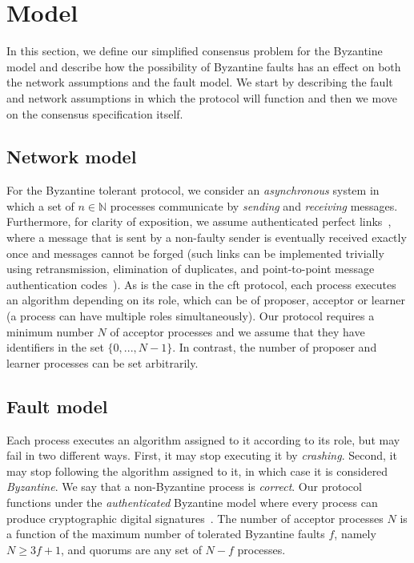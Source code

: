 \section{Model} \label{bft_model}

In this section, we define our simplified consensus problem for the Byzantine model and describe how the possibility of Byzantine faults has an effect on both the network assumptions and the fault model. We start by describing the fault and network assumptions in which the protocol will function and then we move on the consensus specification itself.

\subsection{Network model}
For the Byzantine tolerant protocol, we consider an \emph{asynchronous} system in which a set of $n \in \mathbb{N}$ processes communicate by \emph{sending} and \emph{receiving} messages. Furthermore, for clarity of exposition, we assume authenticated perfect links~\cite{cgr:book}, where a message that is sent by a non-faulty sender is eventually received exactly once and messages cannot be forged (such links can be implemented trivially using retransmission, elimination of duplicates, and point-to-point message authentication codes~\cite{cgr:book}). As is the case in the \acrshort{cft} protocol, each process executes an algorithm depending on its role, which can be of proposer, acceptor or learner (a process can have multiple roles simultaneously). Our protocol requires a minimum number $N$ of acceptor processes and we assume that they have identifiers in the set $\{0,...,N-1\}$. In contrast, the number of proposer and learner processes can be set arbitrarily.

\subsection{Fault model}
Each process executes an algorithm assigned to it according to its role, but may fail in two different ways. First, it may stop executing it by \emph{crashing}. Second, it may stop following the algorithm assigned to it, in which case it is considered \emph{Byzantine}. We say that a non-Byzantine process is \emph{correct}. Our protocol functions under the \emph{authenticated} Byzantine model where every process can produce cryptographic digital signatures~\cite{quorum}. The number of acceptor processes $N$ is a function of the maximum number of tolerated Byzantine faults $f$, namely $N \ge 3f+1$, and quorums are any set of $N-f$ processes. 

